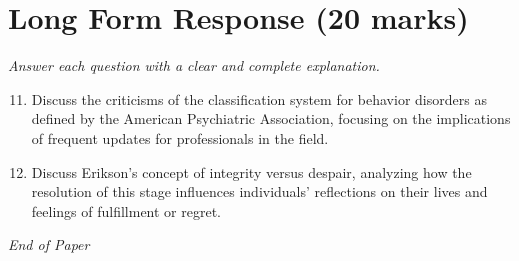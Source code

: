 \documentclass[12pt]{article}
\begin{document}
\section*{Long Form Response (20 marks)}
\textit{Answer each question with a clear and complete explanation.}
\begin{enumerate}[label=\arabic*.]
\setcounter{enumi}{10}
\item Discuss the criticisms of the classification system for behavior disorders as defined by the American Psychiatric Association, focusing on the implications of frequent updates for professionals in the field.
\item Discuss Erikson's concept of integrity versus despair, analyzing how the resolution of this stage influences individuals' reflections on their lives and feelings of fulfillment or regret.
\end{enumerate}

\vfill
\noindent\textit{End of Paper}
\end{document}
